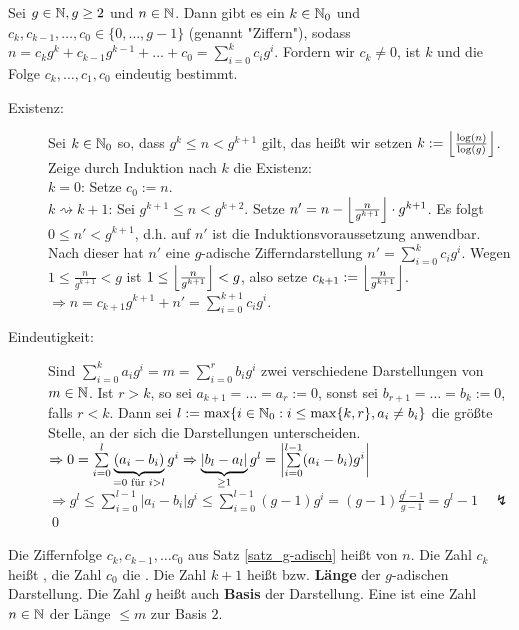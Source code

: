\begin{satz}
\label{satz_g-adisch}
	Sei $g \in \NN, g \geq 2$ und $n \in \NN$. Dann gibt es ein $k \in \NN_0$ und $c_k, c_{k-1}, \dots, c_0 \in \{0, \dots, g-1\}$ (genannt "Ziffern"), sodass $n = c_k g^k + c_{k-1} g^{k-1} + \dots + c_0 = \sum_{i=0}^k c_i g^i$. Fordern wir $c_k \neq 0$, ist $k$ und die Folge $c_k, \dots, c_1, c_0$ eindeutig bestimmt.
\end{satz}

	\begin{description}
	\item[Existenz:] Sei $k \in \NN_0$ so, dass $g^k \leq n < g^{k+1}$ gilt, das heißt wir setzen $k := \floor*{\frac{\log(n)}{\log(g)}}$. Zeige durch Induktion nach $k$ die Existenz: \\
	$k = 0$: Setze $c_0 := n$. \\
	$k \rightsquigarrow k+1$: Sei $g^{k+1} \leq n < g^{k+2}$. Setze $n' = n - \floor*{\frac{n}{g^{k+1}}} \cdot g^{k+1}$. Es folgt $0 \leq n' < g^{k+1}$, d.h. auf $n'$ ist die Induktionsvoraussetzung anwendbar. Nach dieser hat $n'$ eine $g$-adische Zifferndarstellung $n' = \sum\limits_{i=0}^{k} c_i g^i$. Wegen $1 \leq  \frac{n}{g^{k+1}} < g$ ist $1 \leq \floor*{\frac{n}{g^{k+1}}} < g$, also setze $c_{k+1} := \floor*{\frac{n}{g^{k+1}}}$. \\
	$\Rightarrow  n = c_{k+1} g^{k+1} + n' = \sum\limits_{i=0}^{k+1} c_i g^i$.
	\item[Eindeutigkeit:] Sind $\sum\limits_{i=0}^{k} a_i g^i = m = \sum\limits_{i=0}^{r} b_i g^i$ zwei verschiedene Darstellungen von $m \in \NN$. Ist $r > k$, so sei $a_{k+1} = \dots = a_r := 0$, sonst sei $b_{r+1} = \dots = b_k := 0$, falls $r < k$. Dann sei $l := \max \{i \in \NN_0 : i \leq \max\{k,r\}, a_i \neq b_i \}$ die größte Stelle, an der sich die Darstellungen unterscheiden. \\
	$\Rightarrow 0 = \sum\limits_{i=0}^l \underbrace{(a_i-b_i)}_{=0 \text{ für } i>l} g^i \Rightarrow \underbrace{|b_l - a_l|}_{\geq 1} g^l = \abs*{\sum\limits_{i=0}^{l-1} (a_i - b_i)g^i}$ \\
	$\Rightarrow g^l \leq \sum\limits_{i=0}^{l-1} |a_i-b_i| g^i \leq \sum\limits_{i=0}^{l-1} (g-1) g^i = (g-1) \frac{g^l - 1}{g-1} = g^l - 1 \quad \lightning$ \qed
	\end{description}


\begin{defn}
	Die Ziffernfolge $c_k, c_{k-1}, \dots c_0$ aus Satz \ref{satz_g-adisch} heißt  von $n$. Die Zahl $c_k$ heißt , die Zahl $c_0$ die . Die Zahl $k+1$ heißt  bzw. \textbf{Länge} der $g$-adischen Darstellung. Die Zahl $g$ heißt auch \textbf{Basis} der Darstellung. Eine  ist eine Zahl $n \in \NN$ der Länge $\leq m$ zur Basis $2$.  
\end{defn}

